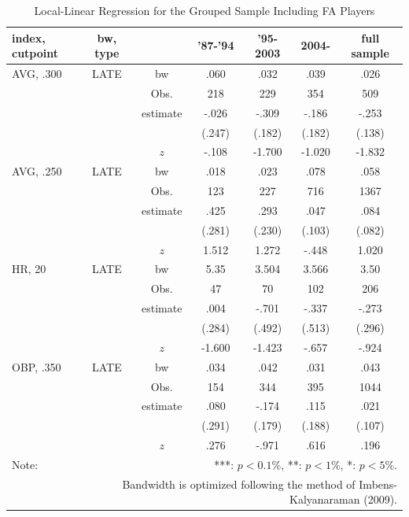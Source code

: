 \documentclass[dvipdfmx, 12pt]{article}
\begin{document}
\begin{table}[H]
  \centering
  \caption{Local-Linear Regression for the Grouped Sample Including FA Players}
  \label{RDD_Era_FA}
  \footnotesize
  \begin{tabular}{lcccccc} \hline
    index, cutpoint & bw, type &  &'87-'94 & '95-2003 & 2004- &full sample \\ \hline \hline
    AVG, .300 & LATE & bw & .060 & .032 & .039 & .026 \\
    &  & Obs. & 218 & 229 & 354 & 509 \\
    &  & estimate & -.026 & -.309 & -.186 & -.253 \\
    &  & & (.247) & (.182) & (.182) & (.138) \\
    & & $z$ & -.108 & -1.700 &  -1.020 & -1.832 \\ \hline
    AVG, .250 & LATE & bw & .018 & .023 & .078 & .058 \\
    &  & Obs. & 123 & 227 & 716 & 1367 \\
    &  & estimate & .425 & .293 & .047 & .084 \\
    &  & & (.281) & (.230) & (.103) & (.082) \\
    & & $z$ & 1.512 & 1.272 & -.448 & 1.020 \\ \hline
    HR, 20 & LATE & bw & 5.35 & 3.504 & 3.566 & 3.50 \\
    &  & Obs. & 47 & 70 & 102 & 206 \\
    &  & estimate & .004 & -.701 & -.337 & -.273 \\
    &  & & (.284) & (.492) & (.513) & (.296) \\
    & & $z$ & -1.600 & -1.423 & -.657 & -.924 \\ \hline
    OBP, .350 & LATE & bw & .034 & .042 & .031 & .043 \\
    &  & Obs. & 154 & 344 & 395 & 1044 \\
    &  & estimate & .080 & -.174 & .115 & .021 \\
    &  & & (.291) & (.179) & (.188) & (.107) \\
    & & $z$ & .276 & -.971 & .616 & .196 \\ \hline
    Note: & \multicolumn{6}{r}{***: $p<0.1\%$, **: $p<1\%$, *: $p<5\%$.} \\
    & \multicolumn{6}{r}{Bandwidth is optimized following the method of Imbens-Kalyanaraman (2009).}
  \end{tabular}
\end{table}


\end{document}
